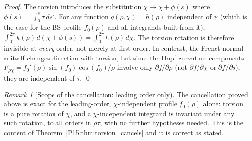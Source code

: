 \documentclass[11pt,a4paper]{article}
\theoremstyle{definition}\newtheorem{definition}[theorem]{Definition}
\theoremstyle{remark}
\newtheorem{remark}[theorem]{Remark}
\begin{document}
\begin{proof}
The torsion introduces the substitution $\chi\to\chi+\phi(s)$ where
$\phi(s)=\int_0^s\tau\,ds'$.  For any function $g(\rho,\chi)=h(\rho)$
independent of $\chi$ (which is the case for the BS profile $f_0(\rho)$
and all integrands built from it),
$\int_0^{2\pi}h(\rho)\,d(\chi+\phi(s)) = \int_0^{2\pi}h(\rho)\,d\chi$.
The torsion rotation is therefore invisible at \emph{every} order,
not merely at first order.
In contrast, the Frenet normal $\mathbf{n}$ itself changes direction
with torsion, but since the Hopf curvature components
$F_{\rho\chi}=f_0'(\rho)\sin(f_0)\cos(f_0)/\rho$
involve only $\partial f/\partial\rho$ (not $\partial f/\partial\chi$
or $\partial f/\partial s$), they are independent of $\tau$.
\qed
\end{proof}

\begin{remark}[Scope of the cancellation: leading order only]
\label{P15:rem:torsion_scope}
The cancellation proved above is exact for the leading-order,
$\chi$-independent profile $f_0(\rho)$ alone: torsion is a pure
rotation of $\chi$, and a $\chi$-independent integrand is invariant
under any such rotation, to all orders in $\rho\tau$, with no
further hypotheses needed. This is the content of
Theorem~\ref{P15:thm:torsion_cancels} and it is correct as stated.


\end{remark}
\end{document}
